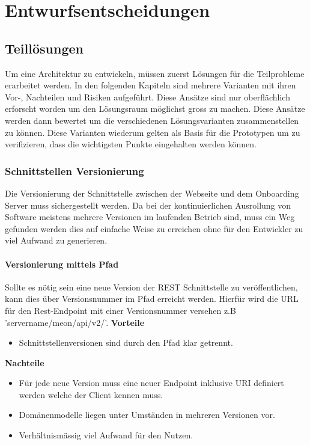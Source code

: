 
\chapter{Entwurfsentscheidungen}
\label{entwurfsentscheidungen}
\section{Teillösungen}

Um eine Architektur zu entwickeln, müssen zuerst Lösungen für die Teilprobleme erarbeitet werden. In den folgenden Kapiteln sind mehrere Varianten mit ihren Vor-, Nachteilen und Risiken aufgeführt. Diese Ansätze sind nur oberflächlich erforscht worden um den Lösungsraum möglichst gross zu machen. Diese Ansätze werden dann bewertet um die verschiedenen Lösungsvarianten zusammenstellen zu können. Diese Varianten wiederum gelten als Basis für die Prototypen um zu verifizieren, dass die wichtigsten Punkte eingehalten werden können. 

\subsection{Schnittstellen Versionierung}

Die Versionierung der Schnittstelle zwischen der Webseite und dem Onboarding Server muss sichergestellt werden. Da bei der kontinuierlichen Ausrollung von Software meistens mehrere Versionen im laufenden Betrieb sind, muss ein Weg gefunden werden dies auf einfache Weise zu erreichen ohne für den Entwickler zu viel Aufwand zu generieren.

\subsubsection{Versionierung mittels Pfad}

Sollte es nötig sein eine neue Version der \Gls{REST} Schnittstelle zu veröffentlichen, kann dies über Versionsnummer im Pfad erreicht werden. Hierfür wird die URL für den Rest-Endpoint mit einer Versionsnummer versehen z.B 'servername/meon/api/v2/'.
\newline
\newline
\textbf{Vorteile}
\begin{itemize}
	\item Schnittstellenversionen sind durch den Pfad klar getrennt.
\end{itemize}
\textbf{Nachteile}
\begin{itemize}
	\item Für jede neue Version muss eine neuer Endpoint inklusive URI definiert werden welche der Client kennen muss.
	\item Domänenmodelle liegen unter Umständen in mehreren Versionen vor.
	\item Verhältnismässig viel Aufwand für den Nutzen.
\end{itemize}


